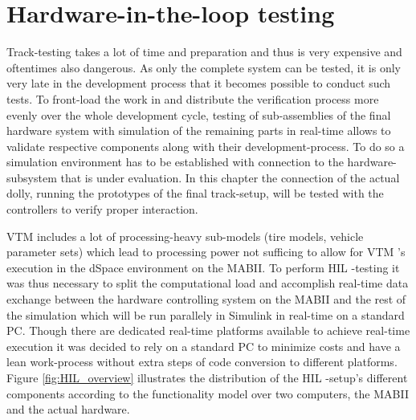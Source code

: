 \documentclass[ExampleMasters.tex]{subfiles}
\begin{document}
	

\section{Hardware-in-the-loop testing}
\label{sec:HIL}

Track-testing takes a lot of time and preparation and thus is very expensive and oftentimes also dangerous. As only the complete system can be tested, it is only very late in the development process that it becomes possible to conduct such tests. To front-load the work in and distribute the verification process more evenly over the whole development cycle, testing of sub-assemblies of the final hardware system with simulation of the remaining parts in real-time allows to validate respective components along with their development-process. To do so a simulation environment has to be established with connection to the hardware-subsystem that is under evaluation. In this chapter the connection of the actual dolly, running the prototypes of the final track-setup, will be tested with the controllers to verify proper interaction.\cite{rapidcontrolprototyping}


\gls{VTM} includes a lot of processing-heavy sub-models (tire models, vehicle parameter sets) which lead to processing power not sufficing to allow for \gls{VTM} 's execution in the dSpace environment on the \gls{MABII}. To perform \gls{HIL} -testing it was thus necessary to split the computational load and accomplish real-time data exchange between the hardware controlling system on the \gls{MABII} and the rest of the simulation which will be run parallely in Simulink in real-time on a standard PC. Though there are dedicated real-time platforms available to achieve real-time execution it was decided to rely on a standard PC to minimize costs and have a lean work-process without extra steps of code conversion to different platforms. Figure \ref{fig:HIL_overview} illustrates the distribution of the \gls{HIL} -setup's different components according to the functionality model over two computers, the \gls{MABII} and the actual hardware. 
\end{document}
